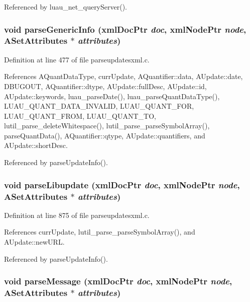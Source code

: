 Referenced by luau\_\-net\_\-query\-Server().
\subsubsection{\setlength{\rightskip}{0pt plus 5cm}void parse\-Generic\-Info (xml\-Doc\-Ptr {\em doc}, xml\-Node\-Ptr {\em node}, {\bf ASet\-Attributes} $\ast$ {\em attributes})\hspace{0.3cm}{\tt  [static]}}\label{parseupdatesxml_8c_a14}




Definition at line 477 of file parseupdatesxml.c.

References AQuant\-Data\-Type, curr\-Update, AQuantifier::data, AUpdate::date, DBUGOUT, AQuantifier::dtype, AUpdate::full\-Desc, AUpdate::id, AUpdate::keywords, luau\_\-parse\-Date(), luau\_\-parse\-Quant\-Data\-Type(), LUAU\_\-QUANT\_\-DATA\_\-INVALID, LUAU\_\-QUANT\_\-FOR, LUAU\_\-QUANT\_\-FROM, LUAU\_\-QUANT\_\-TO, lutil\_\-parse\_\-delete\-Whitespace(), lutil\_\-parse\_\-parse\-Symbol\-Array(), parse\-Quant\-Data(), AQuantifier::qtype, AUpdate::quantifiers, and AUpdate::short\-Desc.

Referenced by parse\-Update\-Info().
\subsubsection{\setlength{\rightskip}{0pt plus 5cm}void parse\-Libupdate (xml\-Doc\-Ptr {\em doc}, xml\-Node\-Ptr {\em node}, {\bf ASet\-Attributes} $\ast$ {\em attributes})\hspace{0.3cm}{\tt  [static]}}\label{parseupdatesxml_8c_a13}




Definition at line 875 of file parseupdatesxml.c.

References curr\-Update, lutil\_\-parse\_\-parse\-Symbol\-Array(), and AUpdate::new\-URL.

Referenced by parse\-Update\-Info().
\subsubsection{\setlength{\rightskip}{0pt plus 5cm}void parse\-Message (xml\-Doc\-Ptr {\em doc}, xml\-Node\-Ptr {\em node}, {\bf ASet\-Attributes} $\ast$ {\em attributes})\hspace{0.3cm}{\tt  [static]}}\label{parseupdatesxml_8c_a12}




